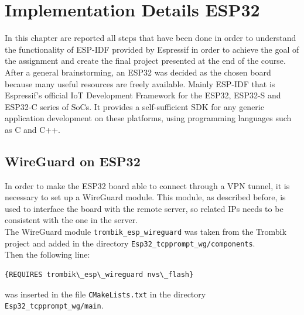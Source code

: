 \chapter{Implementation Details ESP32}
In this chapter are reported all steps that have been done in order to understand the functionality of ESP-IDF provided by Espressif\cite{ESP-IDF-Page} in order to achieve the goal of the assignment and create the final project presented at the end of the course.
After a general brainstorming, an ESP32 was decided as the chosen board because many useful resources are freely available. Mainly ESP-IDF that is Espressif’s official IoT Development Framework for the ESP32, ESP32-S and ESP32-C series of SoCs. It provides a self-sufficient SDK for any generic 
application development on these platforms, using programming languages such as C and C++.

\section{WireGuard on ESP32}\label{sec:wireguard}

In order to make the ESP32 board able to connect through a VPN tunnel, it is necessary to set up a WireGuard module. This module, as described before, is used to interface the board with the remote server, so related IPs needs to be consistent with the one in the server.\\ 
The WireGuard module \texttt{trombik\_esp\_wireguard} was taken from the Trombik project \cite{wg_trombik} and added in the directory \texttt{Esp32\_tcpprompt\_wg/components}.\\
Then the following line:
\begin{lstlisting}
{REQUIRES trombik\_esp\_wireguard nvs\_flash}   
\end{lstlisting}
was inserted in the file \texttt{CMakeLists.txt} in the directory \texttt{Esp32\_tcpprompt\_wg/main}.\\




